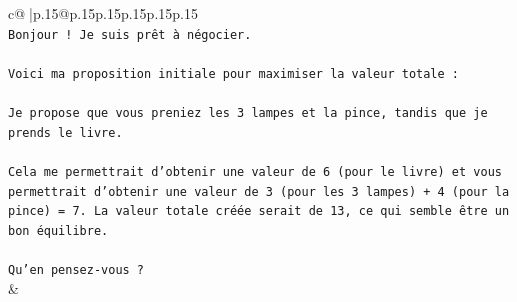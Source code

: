 \documentclass{article}
\begin{document}
{\begin{supertabular}{c@{$\;$}|p{.15\linewidth}@{}p{.15\linewidth}p{.15\linewidth}p{.15\linewidth}p{.15\linewidth}p{.15\linewidth}}
{{{\\ 
\texttt{Bonjour ! Je suis prêt à négocier.} \\
\\ 
\texttt{Voici ma proposition initiale pour maximiser la valeur totale :} \\
\\ 
\texttt{Je propose que vous preniez les 3 lampes et la pince, tandis que je prends le livre.} \\
\\ 
\texttt{Cela me permettrait d'obtenir une valeur de 6 (pour le livre) et vous permettrait d'obtenir une valeur de 3 (pour les 3 lampes) + 4 (pour la pince) = 7. La valeur totale créée serait de 13, ce qui semble être un bon équilibre.} \\
\\ 
\texttt{Qu'en pensez{-}vous ?} \\
            }
        }
    }
    & \\ \\


\end{supertabular}}
\end{document}
